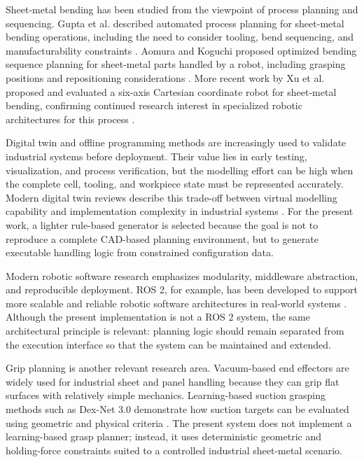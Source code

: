 \documentclass[journal]{IEEEtran}
\begin{document}
Sheet-metal bending has been studied from the viewpoint of process planning and sequencing. Gupta et al. described automated process planning for sheet-metal bending operations, including the need to consider tooling, bend sequencing, and manufacturability constraints \cite{Gupta1998SheetMetalBending}. Aomura and Koguchi proposed optimized bending sequence planning for sheet-metal parts handled by a robot, including grasping positions and repositioning considerations \cite{Aomura2002RoboticBending}. More recent work by Xu et al. proposed and evaluated a six-axis Cartesian coordinate robot for sheet-metal bending, confirming continued research interest in specialized robotic architectures for this process \cite{Xu2019SheetMetalBendingRobot}.

Digital twin and offline programming methods are increasingly used to validate industrial systems before deployment. Their value lies in early testing, visualization, and process verification, but the modelling effort can be high when the complete cell, tooling, and workpiece state must be represented accurately. Modern digital twin reviews describe this trade-off between virtual modelling capability and implementation complexity in industrial systems \cite{Tao2021DigitalTwin}. For the present work, a lighter rule-based generator is selected because the goal is not to reproduce a complete CAD-based planning environment, but to generate executable handling logic from constrained configuration data.

Modern robotic software research emphasizes modularity, middleware abstraction, and reproducible deployment. ROS 2, for example, has been developed to support more scalable and reliable robotic software architectures in real-world systems \cite{Macenski2022ROS2}. Although the present implementation is not a ROS 2 system, the same architectural principle is relevant: planning logic should remain separated from the execution interface so that the system can be maintained and extended.

Grip planning is another relevant research area. Vacuum-based end effectors are widely used for industrial sheet and panel handling because they can grip flat surfaces with relatively simple mechanics. Learning-based suction grasping methods such as Dex-Net 3.0 demonstrate how suction targets can be evaluated using geometric and physical criteria \cite{Mahler2018DexNet3}. The present system does not implement a learning-based grasp planner; instead, it uses deterministic geometric and holding-force constraints suited to a controlled industrial sheet-metal scenario.
\end{document}
